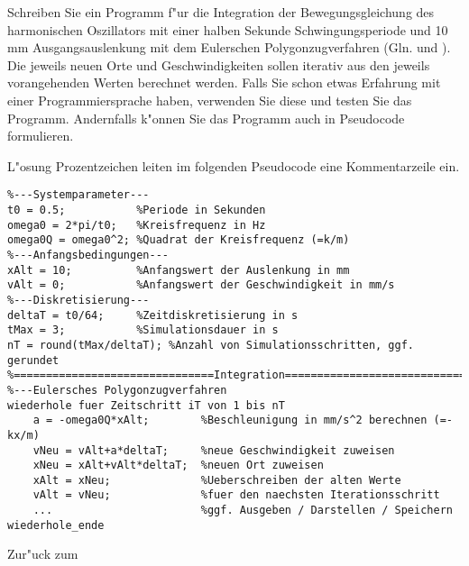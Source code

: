 \begin{MExercises}
\begin{MExercise}
Schreiben Sie ein Programm f"ur die Integration der Bewegungsgleichung des harmonischen Oszillators mit einer halben Sekunde Schwingungsperiode und 10 mm Ausgangsauslenkung mit dem Eulerschen Polygonzugverfahren (Gln.  und ). Die jeweils neuen Orte und Geschwindigkeiten sollen iterativ aus den jeweils vorangehenden Werten berechnet werden. Falls Sie schon etwas Erfahrung mit einer Programmiersprache haben, verwenden Sie diese und testen Sie das Programm. Andernfalls k"onnen Sie das Programm auch in Pseudocode formulieren.

\begin{MHint}{L"osung}
Prozentzeichen leiten im folgenden Pseudocode eine Kommentarzeile ein.
\begin{verbatim}
%---Systemparameter---
t0 = 0.5;           %Periode in Sekunden
omega0 = 2*pi/t0;   %Kreisfrequenz in Hz
omega0Q = omega0^2; %Quadrat der Kreisfrequenz (=k/m)
%---Anfangsbedingungen---
xAlt = 10;          %Anfangswert der Auslenkung in mm
vAlt = 0;           %Anfangswert der Geschwindigkeit in mm/s
%---Diskretisierung---
deltaT = t0/64;     %Zeitdiskretisierung in s
tMax = 3;           %Simulationsdauer in s
nT = round(tMax/deltaT); %Anzahl von Simulationsschritten, ggf. gerundet
%===============================Integration================================
%---Eulersches Polygonzugverfahren
wiederhole fuer Zeitschritt iT von 1 bis nT
    a = -omega0Q*xAlt;        %Beschleunigung in mm/s^2 berechnen (=-kx/m)
    vNeu = vAlt+a*deltaT;     %neue Geschwindigkeit zuweisen
    xNeu = xAlt+vAlt*deltaT;  %neuen Ort zuweisen
    xAlt = xNeu;              %Ueberschreiben der alten Werte
    vAlt = vNeu;              %fuer den naechsten Iterationsschritt
    ...                       %ggf. Ausgeben / Darstellen / Speichern
wiederhole_ende
\end{verbatim}
\end{MHint}

Zur"uck zum 
\end{MExercise}


\end{MExercises}
